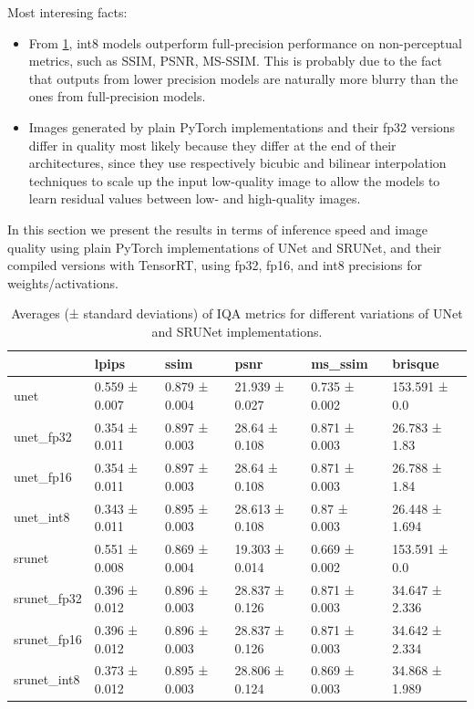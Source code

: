 \label{chap:results}

Most interesing facts:
\begin{itemize}
\item{
  From \cref{tab:tab1}, int8 models outperform full-precision performance on non-perceptual metrics, such as SSIM, PSNR, MS-SSIM. This is probably due to the fact that outputs from lower precision models are naturally more blurry than the ones from full-precision models.
}

\item{
  Images generated by plain PyTorch implementations and their fp32 versions differ in quality most likely because they differ at the end of their architectures, since they use respectively bicubic and bilinear interpolation techniques to scale up the input low-quality image to allow the models to learn residual values between low- and high-quality images.
}
\end{itemize}
\pagebreak

In this section we present the results in terms of inference speed and image quality using plain PyTorch implementations of UNet and SRUNet, and their compiled versions with TensorRT, using fp32, fp16, and int8 precisions for weights/activations.

\begin{table}[t]
\begin{tabular}{llllll}
\toprule
{} &          lpips &           ssim &            psnr &        ms\_ssim &         brisque \\
\midrule
unet        &  0.559 ± 0.007 &  0.879 ± 0.004 &  21.939 ± 0.027 &  0.735 ± 0.002 &   153.591 ± 0.0 \\
unet\_fp32   &  0.354 ± 0.011 &  0.897 ± 0.003 &   28.64 ± 0.108 &  0.871 ± 0.003 &   26.783 ± 1.83 \\
unet\_fp16   &  0.354 ± 0.011 &  0.897 ± 0.003 &   28.64 ± 0.108 &  0.871 ± 0.003 &   26.788 ± 1.84 \\
unet\_int8   &  0.343 ± 0.011 &  0.895 ± 0.003 &  28.613 ± 0.108 &   0.87 ± 0.003 &  26.448 ± 1.694 \\
srunet      &  0.551 ± 0.008 &  0.869 ± 0.004 &  19.303 ± 0.014 &  0.669 ± 0.002 &   153.591 ± 0.0 \\
srunet\_fp32 &  0.396 ± 0.012 &  0.896 ± 0.003 &  28.837 ± 0.126 &  0.871 ± 0.003 &  34.647 ± 2.336 \\
srunet\_fp16 &  0.396 ± 0.012 &  0.896 ± 0.003 &  28.837 ± 0.126 &  0.871 ± 0.003 &  34.642 ± 2.334 \\
srunet\_int8 &  0.373 ± 0.012 &  0.895 ± 0.003 &  28.806 ± 0.124 &  0.869 ± 0.003 &  34.868 ± 1.989 \\
\bottomrule
\end{tabular}
\caption{Averages (± standard deviations) of IQA metrics for different variations of UNet and SRUNet implementations.}
\label{tab:tab1}
\end{table}


